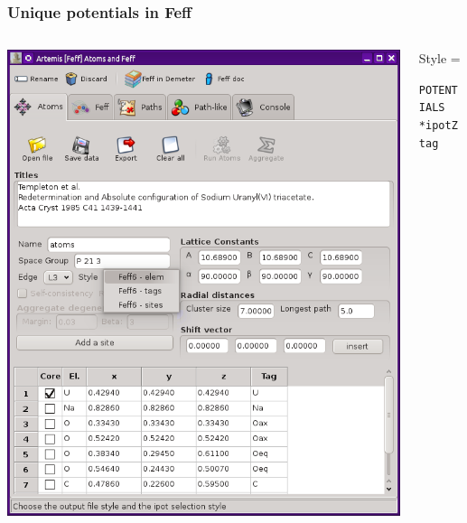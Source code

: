 \documentclass[10pt, xcolor=x11names, compress]{beamer}
\begin{document}
\begin{frame}[fragile]
  \frametitle{Unique potentials in Feff}
  \begin{columns}[T]
    \begin{column}{0.5\linewidth}
      \includegraphics[width=0.9\linewidth]{images/atoms.png}
    \end{column}
    \begin{column}{0.5\linewidth}
      Style = \\
      \vspace{-2ex}
      \begin{block}{}
        \tiny\begin{alltt}
 {\color{SteelBlue4}POTENTIALS}
  {\color{Blue4}* ipot   Z      tag}
        \end{alltt}
        \vspace{-9ex}
      \end{block}
\end{column}
\end{columns}
\end{frame}
\end{document}
